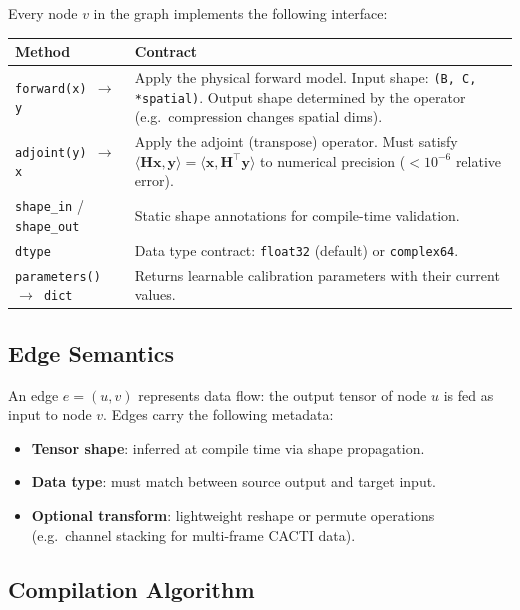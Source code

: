 \documentclass[11pt]{article}
\begin{document}
Every node $v$ in the graph implements the following interface:

\begin{center}
\renewcommand{\arraystretch}{1.3}
\begin{tabular}{lp{8cm}}
\toprule
\textbf{Method} & \textbf{Contract} \\
\midrule
\texttt{forward(x) $\to$ y} &
  Apply the physical forward model.  Input shape: \texttt{(B, C, *spatial)}.
  Output shape determined by the operator (e.g.\ compression changes spatial dims). \\
\texttt{adjoint(y) $\to$ x} &
  Apply the adjoint (transpose) operator.  Must satisfy
  $\langle \mathbf{H}\mathbf{x}, \mathbf{y}\rangle =
   \langle \mathbf{x}, \mathbf{H}^\top\mathbf{y}\rangle$
  to numerical precision ($<10^{-6}$ relative error). \\
\texttt{shape\_in} / \texttt{shape\_out} &
  Static shape annotations for compile-time validation. \\
\texttt{dtype} &
  Data type contract: \texttt{float32} (default) or \texttt{complex64}. \\
\texttt{parameters() $\to$ dict} &
  Returns learnable calibration parameters with their current values. \\
\bottomrule
\end{tabular}
\end{center}

\subsection{Edge Semantics}

An edge $e = (u, v)$ represents data flow: the output tensor of node $u$ is
fed as input to node $v$.  Edges carry the following metadata:
\begin{itemize}
  \item \textbf{Tensor shape}: inferred at compile time via shape propagation.
  \item \textbf{Data type}: must match between source output and target input.
  \item \textbf{Optional transform}: lightweight reshape or permute operations
        (e.g.\ channel stacking for multi-frame CACTI data).
\end{itemize}

\subsection{Compilation Algorithm}
\end{document}
